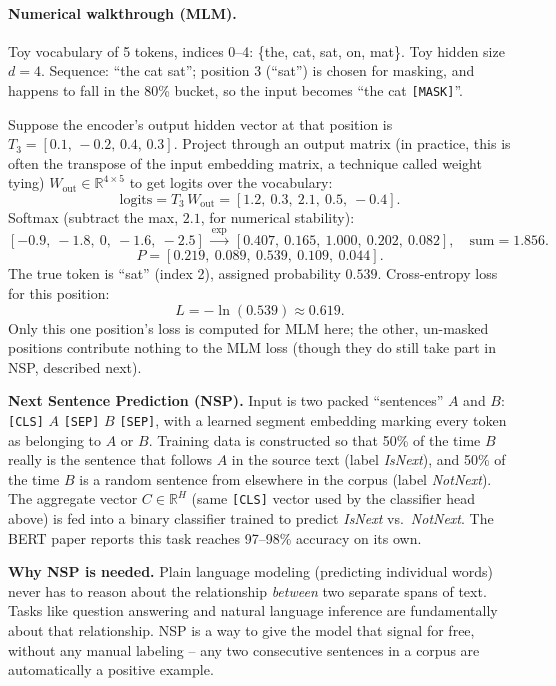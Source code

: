 \documentclass[11pt]{article}
\begin{document}
\paragraph{Numerical walkthrough (MLM).} Toy vocabulary of 5 tokens, indices 0--4: \{the, cat, sat, on, mat\}. Toy hidden size $d=4$. Sequence: ``the cat sat''; position 3 (``sat'') is chosen for masking, and happens to fall in the 80\% bucket, so the input becomes ``the cat \texttt{[MASK]}''.

Suppose the encoder's output hidden vector at that position is $T_3 = [0.1,\,-0.2,\,0.4,\,0.3]$. Project through an output matrix (in practice, this is often the transpose of the input embedding matrix, a technique called weight tying) $W_{\text{out}} \in \mathbb{R}^{4\times5}$ to get logits over the vocabulary:
\[
\text{logits} = T_3 \, W_{\text{out}} = [1.2,\ 0.3,\ 2.1,\ 0.5,\ -0.4].
\]
Softmax (subtract the max, $2.1$, for numerical stability):
\[
[-0.9,\ -1.8,\ 0,\ -1.6,\ -2.5] \ \xrightarrow{\exp}\ [0.407,\ 0.165,\ 1.000,\ 0.202,\ 0.082],\quad \text{sum} = 1.856.
\]
\[
P = [0.219,\ 0.089,\ 0.539,\ 0.109,\ 0.044].
\]
The true token is ``sat'' (index 2), assigned probability $0.539$. Cross-entropy loss for this position:
\[
L = -\ln(0.539) \approx 0.619.
\]
Only this one position's loss is computed for MLM here; the other, un-masked positions contribute nothing to the MLM loss (though they do still take part in NSP, described next).

\textbf{Next Sentence Prediction (NSP).} Input is two packed ``sentences'' $A$ and $B$: \texttt{[CLS]} $A$ \texttt{[SEP]} $B$ \texttt{[SEP]}, with a learned segment embedding marking every token as belonging to $A$ or $B$. Training data is constructed so that 50\% of the time $B$ really is the sentence that follows $A$ in the source text (label \emph{IsNext}), and 50\% of the time $B$ is a random sentence from elsewhere in the corpus (label \emph{NotNext}). The aggregate vector $C \in \mathbb{R}^H$ (same \texttt{[CLS]} vector used by the classifier head above) is fed into a binary classifier trained to predict \emph{IsNext} vs.\ \emph{NotNext}. The BERT paper reports this task reaches 97--98\% accuracy on its own.

\textbf{Why NSP is needed.} Plain language modeling (predicting individual words) never has to reason about the relationship \emph{between} two separate spans of text. Tasks like question answering and natural language inference are fundamentally about that relationship. NSP is a way to give the model that signal for free, without any manual labeling -- any two consecutive sentences in a corpus are automatically a positive example.
\end{document}
